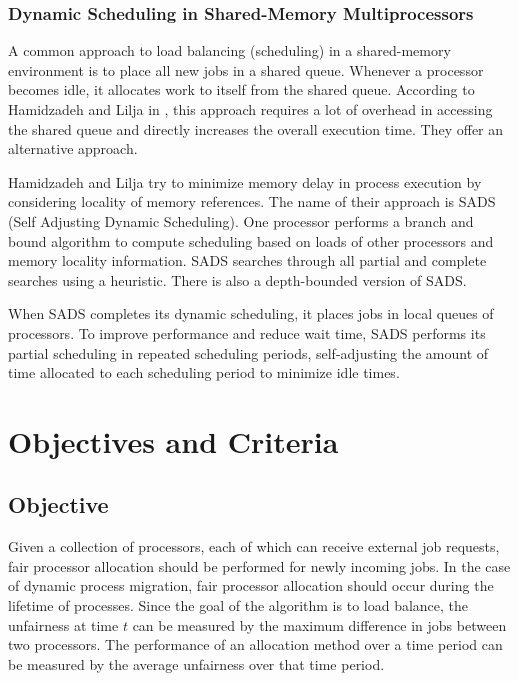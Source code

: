 \documentclass{report}
\begin{document}
\subsection{Dynamic Scheduling in Shared-Memory Multiprocessors
\cite{shared_queue}}

A common approach to load balancing (scheduling) in a shared-memory
environment is to place all new jobs in a shared queue.  Whenever a
processor becomes idle, it allocates work to itself from the shared queue.
According to Hamidzadeh and Lilja in \cite{shared_queue}, this approach
requires a lot of overhead in accessing the shared queue and directly
increases the overall execution time.  They offer an alternative approach.

Hamidzadeh and Lilja try to minimize memory delay in process execution by
considering locality of memory references.  The name of their approach is
SADS (Self Adjusting Dynamic Scheduling).  One processor performs a branch
and bound algorithm to compute scheduling based on loads of other processors
and memory locality information.  SADS searches through all partial and
complete searches using a heuristic.  There is also a depth-bounded version
of SADS.  

When SADS completes its dynamic scheduling, it places jobs in local queues
of processors.  To improve performance and reduce wait time, SADS performs
its partial scheduling in repeated scheduling periods, self-adjusting the
amount of time allocated to each scheduling period to minimize idle times.









\chapter{Objectives and Criteria}
\label{obj_criteria}

\section{Objective}

Given a collection of processors, each of which can receive external job
requests, fair processor allocation should be performed for newly incoming
jobs.  In the case of dynamic process migration, fair processor allocation
should occur during the lifetime of processes.  Since the goal of the
algorithm is to load balance, the unfairness at time $t$ can be measured by
the maximum difference in jobs between two processors.  The performance of
an allocation method over a time period can be measured by the average
unfairness over that time period.
\end{document}

